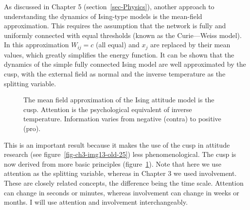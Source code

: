 \documentclass[
  a4paper,
  DIV=11,
  numbers=noendperiod,
  oneside]{scrreprt}
\begin{document}
As discussed in Chapter 5 (section~\ref{sec-Physics}), another approach
to understanding the dynamics of Ising-type models is the mean-field
approximation. This requires the assumption that the network is fully
and uniformly connected with equal thresholds (known as the
Curie---Weiss model). In this approximation \(W_{ij} = c\) (all equal)
and \(x_{j}\) are replaced by their mean values, which greatly
simplifies the energy function. It can be shown that the dynamics of the
simple fully connected Ising model are well approximated by the cusp,
with the external field as normal and the inverse temperature as the
splitting variable.

\begin{figure}


\caption{\label{fig-ch6-img11-old-80}The mean field approximation of the
Ising attitude model is the cusp. Attention is the psychological
equivalent of inverse temperature. Information varies from negative
(contra) to positive (pro).}

\end{figure}%

This is an important result because it makes the use of the cusp in
attitude research (see figure~\ref{fig-ch3-img13-old-25}) less
phenomenological. The cusp is now derived from more basic principles
(figure~\ref{fig-ch6-img11-old-80}). Note that here we use attention as
the splitting variable, whereas in Chapter 3 we used involvement. These
are closely related concepts, the difference being the time scale.
Attention can change in seconds or minutes, whereas involvement can
change in weeks or months. I will use attention and involvement
interchangeably.
\end{document}
